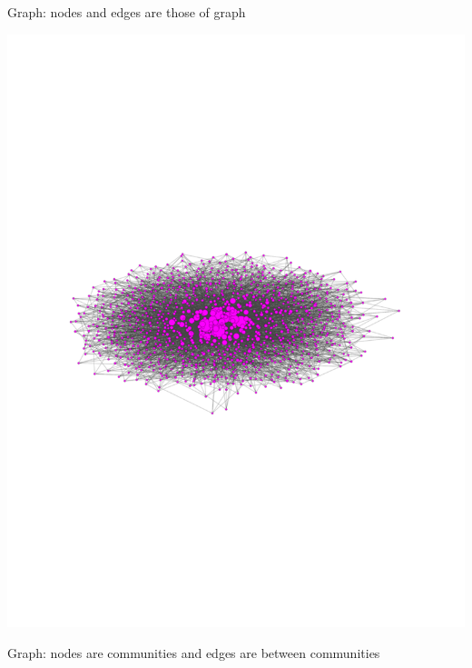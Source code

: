 \documentclass[landscape,paperwidth=70in,paperheight=46in,fontscale=0.225]{baposter} %
\begin{document}
\begin{poster}
{%
%
%
%

\vspace{0.3in}


\begin{minipage}{0.3\linewidth}
Graph:  nodes and edges are those of graph

\includegraphics[scale=0.3]{figures/graph_nodes.pdf} 
\end{minipage}
\hfill
\begin{minipage}{0.3\linewidth}

Graph:  nodes are communities
and edges are between communities


\end{minipage}}
\end{poster}
\end{document}
